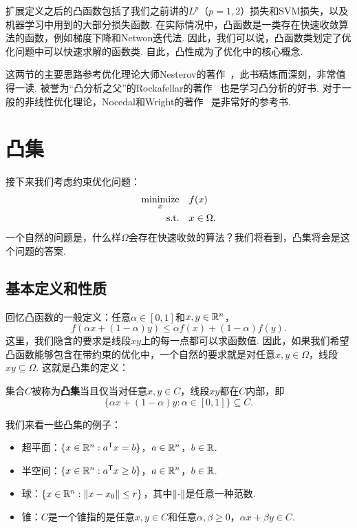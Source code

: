 扩展定义之后的凸函数包括了我们之前讲的$L^p$（$p=1,2$）损失和SVM损失，以及机器学习中用到的大部分损失函数. 在实际情况中，凸函数是一类存在快速收敛算法的函数，例如梯度下降和Netwon迭代法. 因此，我们可以说，凸函数类划定了优化问题中可以快速求解的函数类. 自此，凸性成为了优化中的核心概念. 


\begin{remark}
    这两节的主要思路参考优化理论大师Nesterov的著作~\cite{nesterovIntroductoryLecturesConvex2004}，此书精炼而深刻，非常值得一读. 被誉为“凸分析之父”的Rockafellar的著作~\cite{rockafellarConvexAnalysis1970} 也是学习凸分析的好书. 对于一般的非线性优化理论，Nocedal和Wright的著作~\cite{NumericalOptimization2006} 是非常好的参考书.
\end{remark}

\section{凸集}
接下来我们考虑约束优化问题：
\begin{align*}
    \operatorname*{minimize}_x &\quad f(x)\\
    \text{s.t.}&\quad x\in \Omega.
\end{align*}
一个自然的问题是，什么样$\Omega$会存在快速收敛的算法？我们将看到，凸集将会是这个问题的答案.

\subsection{基本定义和性质}
回忆凸函数的一般定义：任意$\alpha\in[0,1]$和$x,y\in\mathbb{R}^n$，
    \[
        f(\alpha x+(1-\alpha) y)\leq \alpha f(x)+(1-\alpha) f(y).
    \]
这里，我们隐含的要求是线段$xy$上的每一点都可以求函数值. 因此，如果我们希望凸函数能够包含在带约束的优化中，一个自然的要求就是对任意$x,y\in \Omega$，线段$xy\subseteq \Omega$. 这就是凸集的定义：

\begin{definition}[凸集]
集合$C$被称为\textbf{凸集}当且仅当对任意$x,y\in C$，线段$xy$都在$C$内部，即
\[\{\alpha x+(1-\alpha)y:\alpha\in [0,1]\}\subseteq C.\]
\end{definition}

我们来看一些凸集的例子：
\begin{example}
\begin{itemize}
    \item 超平面：$\{x\in\mathbb{R}^n:a^{\mathsf{T}} x= b\}$，$a\in\mathbb{R}^n$，$b\in\mathbb{R}$. 
    \item 半空间：$\{x\in\mathbb{R}^n:a^{\mathsf{T}} x\geq b\}$，$a\in\mathbb{R}^n$，$b\in\mathbb{R}$. 
    \item 球：$\{x\in\mathbb{R}^n:\left\|x-x_0\right\|\leq r\}$，其中$\left\|\cdot\right\|$是任意一种范数. 
    \item 锥：$C$是一个锥指的是任意$x,y\in C$和任意$\alpha,\beta\geq 0$，$\alpha x+\beta y\in C$. 
\end{itemize}
\end{example}

